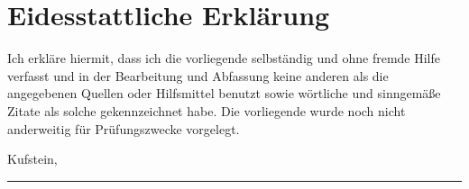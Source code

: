 \chapter*{Eidesstattliche Erklärung}
\thispagestyle{empty}

Ich erkläre hiermit, dass ich die vorliegende \worktype selbständig und ohne fremde Hilfe verfasst und in der Bearbeitung und Abfassung keine anderen als die angegebenen Quellen oder Hilfsmittel benutzt sowie wörtliche und sinngemäße Zitate als solche gekennzeichnet habe. Die vorliegende \worktype wurde noch nicht anderweitig für Prüfungszwecke vorgelegt.

\vspace{2cm}
Kufstein, \mydate

\vspace{2cm}
\rule{10cm}{1pt}\\
\myname{}

